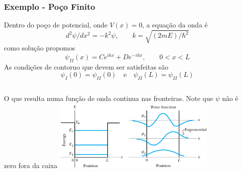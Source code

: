 \documentclass[12pt,brazil,table]{beamer}
\begin{document}

\begin{frame}
  \frametitle{Exemplo - Poço Finito}
  \fontsize{9pt}{11pt}\selectfont

  Dentro do poço de potencial, onde $V(x) = 0$, a equação da onda é
  \[
   d^2\psi / dx^2 = -k^2\psi,\qquad k=\sqrt{(2mE)/\hbar^2}
  \]
  como solução propomos
  \[
   \psi_{II}(x) = Ce^{ikx} + De^{-ikx},\qquad 0< x < L
  \]
  As condições de contorno que devem ser satisfeitas são
  \[
   \psi_I(0) = \psi_{II}(0)\quad\text{e}\quad \psi_{II}(L) = \psi_{II}(L)
  \]
  
  \begin{columns}
    O que resulta numa função de onda continua nas fronteiras.\newline\newline
    Note que $\psi$ não é zero fora da caixa
    \includegraphics[height=3.5cm]{figuras/fig21}
  \end{columns}  

  
\end{frame}


\end{document}
